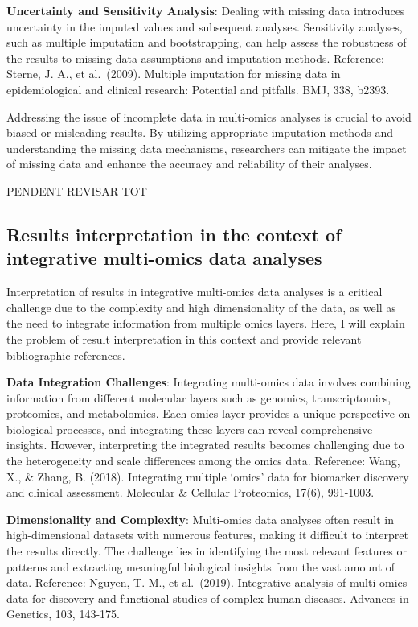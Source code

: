 \documentclass[a4paper, nobind]{templates/ociamthesis}
\begin{document}
\textbf{Uncertainty and Sensitivity Analysis}: Dealing with missing data introduces uncertainty in the imputed values and subsequent analyses. Sensitivity analyses, such as multiple imputation and bootstrapping, can help assess the robustness of the results to missing data assumptions and imputation methods. Reference: Sterne, J. A., et al.~(2009). Multiple imputation for missing data in epidemiological and clinical research: Potential and pitfalls. BMJ, 338, b2393.

Addressing the issue of incomplete data in multi-omics analyses is crucial to avoid biased or misleading results. By utilizing appropriate imputation methods and understanding the missing data mechanisms, researchers can mitigate the impact of missing data and enhance the accuracy and reliability of their analyses.

PENDENT REVISAR TOT

\hypertarget{results-interpretation-in-the-context-of-integrative-multi-omics-data-analyses}{%
\subsection{Results interpretation in the context of integrative multi-omics data analyses}\label{results-interpretation-in-the-context-of-integrative-multi-omics-data-analyses}}

Interpretation of results in integrative multi-omics data analyses is a critical challenge due to the complexity and high dimensionality of the data, as well as the need to integrate information from multiple omics layers. Here, I will explain the problem of result interpretation in this context and provide relevant bibliographic references.

\textbf{Data Integration Challenges}: Integrating multi-omics data involves combining information from different molecular layers such as genomics, transcriptomics, proteomics, and metabolomics. Each omics layer provides a unique perspective on biological processes, and integrating these layers can reveal comprehensive insights. However, interpreting the integrated results becomes challenging due to the heterogeneity and scale differences among the omics data. Reference: Wang, X., \& Zhang, B. (2018). Integrating multiple `omics' data for biomarker discovery and clinical assessment. Molecular \& Cellular Proteomics, 17(6), 991-1003.

\textbf{Dimensionality and Complexity}: Multi-omics data analyses often result in high-dimensional datasets with numerous features, making it difficult to interpret the results directly. The challenge lies in identifying the most relevant features or patterns and extracting meaningful biological insights from the vast amount of data. Reference: Nguyen, T. M., et al.~(2019). Integrative analysis of multi-omics data for discovery and functional studies of complex human diseases. Advances in Genetics, 103, 143-175.
\end{document}
